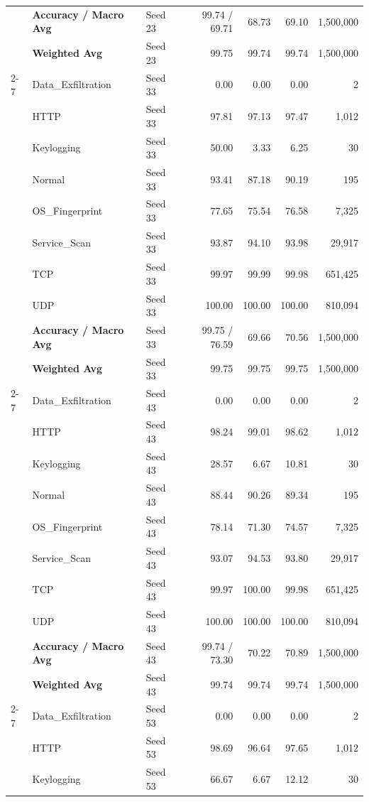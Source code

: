 \documentclass[a4paper,fleqn]{cas-sc}
\begin{document}
{\begin{landscape}
\begin{longtable}{lllrrrr}
 & \textbf{Accuracy / Macro Avg} & Seed 23 & 99.74 / 69.71 & 68.73 & 69.10 & 1,500,000 \\
 & \textbf{Weighted Avg} & Seed 23 & 99.75 & 99.74 & 99.74 & 1,500,000 \\
\cline{2-7}
 & Data\_Exfiltration & Seed 33 & 0.00 & 0.00 & 0.00 & 2 \\
 & HTTP & Seed 33 & 97.81 & 97.13 & 97.47 & 1,012 \\
 & Keylogging & Seed 33 & 50.00 & 3.33 & 6.25 & 30 \\
 & Normal & Seed 33 & 93.41 & 87.18 & 90.19 & 195 \\
 & OS\_Fingerprint & Seed 33 & 77.65 & 75.54 & 76.58 & 7,325 \\
 & Service\_Scan & Seed 33 & 93.87 & 94.10 & 93.98 & 29,917 \\
 & TCP & Seed 33 & 99.97 & 99.99 & 99.98 & 651,425 \\
 & UDP & Seed 33 & 100.00 & 100.00 & 100.00 & 810,094 \\
 & \textbf{Accuracy / Macro Avg} & Seed 33 & 99.75 / 76.59 & 69.66 & 70.56 & 1,500,000 \\
 & \textbf{Weighted Avg} & Seed 33 & 99.75 & 99.75 & 99.75 & 1,500,000 \\
\cline{2-7}
 & Data\_Exfiltration & Seed 43 & 0.00 & 0.00 & 0.00 & 2 \\
 & HTTP & Seed 43 & 98.24 & 99.01 & 98.62 & 1,012 \\
 & Keylogging & Seed 43 & 28.57 & 6.67 & 10.81 & 30 \\
 & Normal & Seed 43 & 88.44 & 90.26 & 89.34 & 195 \\
 & OS\_Fingerprint & Seed 43 & 78.14 & 71.30 & 74.57 & 7,325 \\
 & Service\_Scan & Seed 43 & 93.07 & 94.53 & 93.80 & 29,917 \\
 & TCP & Seed 43 & 99.97 & 100.00 & 99.98 & 651,425 \\
 & UDP & Seed 43 & 100.00 & 100.00 & 100.00 & 810,094 \\
 & \textbf{Accuracy / Macro Avg} & Seed 43 & 99.74 / 73.30 & 70.22 & 70.89 & 1,500,000 \\
 & \textbf{Weighted Avg} & Seed 43 & 99.74 & 99.74 & 99.74 & 1,500,000 \\
\cline{2-7}
 & Data\_Exfiltration & Seed 53 & 0.00 & 0.00 & 0.00 & 2 \\
 & HTTP & Seed 53 & 98.69 & 96.64 & 97.65 & 1,012 \\
 & Keylogging & Seed 53 & 66.67 & 6.67 & 12.12 & 30 \\

\end{longtable}
\end{landscape}}
\end{document}
